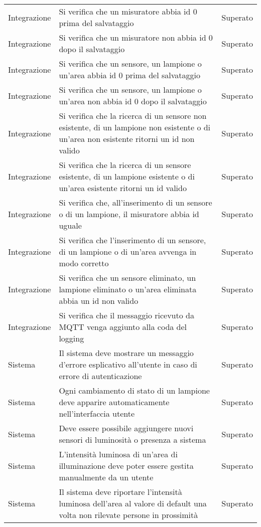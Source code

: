 \begin{center}
\begin{xltabular}{\linewidth}{|l|X|l|}
        \hline
        Integrazione & Si verifica che un misuratore abbia id 0 prima del salvataggio & Superato\\
        Integrazione & Si verifica che un misuratore non abbia id 0 dopo il salvataggio & Superato\\
        Integrazione & Si verifica che un sensore, un lampione o un'area abbia id 0 prima del salvataggio & Superato\\
        Integrazione & Si verifica che un sensore, un lampione o un'area non abbia id 0 dopo il salvataggio & Superato\\
        Integrazione & Si verifica che la ricerca di un sensore non esistente, di un lampione non esistente o di un'area non esistente ritorni un id non valido & Superato\\
        Integrazione & Si verifica che la ricerca di un sensore esistente, di un lampione esistente o di un'area esistente ritorni un id valido & Superato\\
        Integrazione & Si verifica che, all'inserimento di un sensore o di un lampione, il misuratore abbia id uguale & Superato\\
        Integrazione & Si verifica che l'inserimento di un sensore, di un lampione o di un'area avvenga in modo corretto & Superato\\
        Integrazione & Si verifica che un sensore eliminato, un lampione eliminato o un'area eliminata abbia un id non valido & Superato\\
        Integrazione & Si verifica che il messaggio ricevuto da MQTT venga aggiunto alla coda del logging & Superato\\
        \hline
        Sistema & Il sistema deve mostrare un messaggio d'errore esplicativo all'utente in caso di errore di autenticazione & Superato\\
        Sistema & Ogni cambiamento di stato di un lampione deve apparire automaticamente nell'interfaccia utente & Superato\\
        Sistema & Deve essere possibile aggiungere nuovi sensori di luminosità o presenza a sistema & Superato\\
        Sistema & L'intensità luminosa di un'area di illuminazione deve poter essere gestita manualmente da un utente & Superato\\
        Sistema & Il sistema deve riportare l'intensità luminosa dell'area al valore di default una volta non rilevate persone in prossimità & Superato\\

\end{xltabular}
\end{center}
